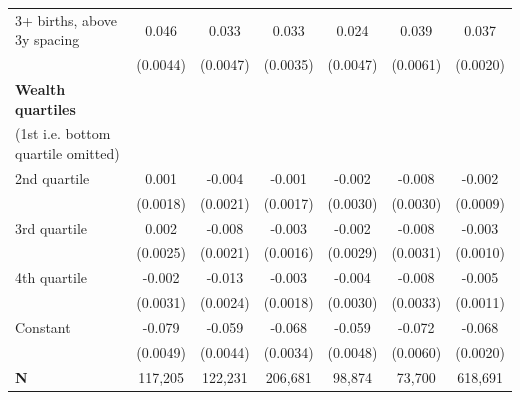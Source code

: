 {\begin{tabular}{l*{6}{c}}
\addlinespace
\hspace*{1em}3+ births, above 3y spacing&       0.046\sym{***}&       0.033\sym{***}&       0.033\sym{***}&       0.024\sym{***}&       0.039\sym{***}&       0.037\sym{***}\\
                    &    (0.0044)         &    (0.0047)         &    (0.0035)         &    (0.0047)         &    (0.0061)         &    (0.0020)         \\
\addlinespace
\textbf{Wealth quartiles} \\ (1st i.e. bottom quartile omitted)&                     &                     &                     &                     &                     &                     \\
\addlinespace
\hspace*{1em}2nd quartile        &       0.001         &      -0.004         &      -0.001         &      -0.002         &      -0.008\sym{*}  &      -0.002         \\
                    &    (0.0018)         &    (0.0021)         &    (0.0017)         &    (0.0030)         &    (0.0030)         &    (0.0009)         \\
\addlinespace
\hspace*{1em}3rd quartile        &       0.002         &      -0.008\sym{***}&      -0.003         &      -0.002         &      -0.008\sym{**} &      -0.003\sym{**} \\
                    &    (0.0025)         &    (0.0021)         &    (0.0016)         &    (0.0029)         &    (0.0031)         &    (0.0010)         \\
\addlinespace
\hspace*{1em}4th quartile        &      -0.002         &      -0.013\sym{***}&      -0.003         &      -0.004         &      -0.008\sym{*}  &      -0.005\sym{***}\\
                    &    (0.0031)         &    (0.0024)         &    (0.0018)         &    (0.0030)         &    (0.0033)         &    (0.0011)         \\
\addlinespace
\hspace*{1em}Constant            &      -0.079\sym{***}&      -0.059\sym{***}&      -0.068\sym{***}&      -0.059\sym{***}&      -0.072\sym{***}&      -0.068\sym{***}\\
                    &    (0.0049)         &    (0.0044)         &    (0.0034)         &    (0.0048)         &    (0.0060)         &    (0.0020)         \\
\midrule
\textbf{N}          &     117,205         &     122,231         &     206,681         &      98,874         &      73,700         &     618,691         \\
\bottomrule
\end{tabular}
}
